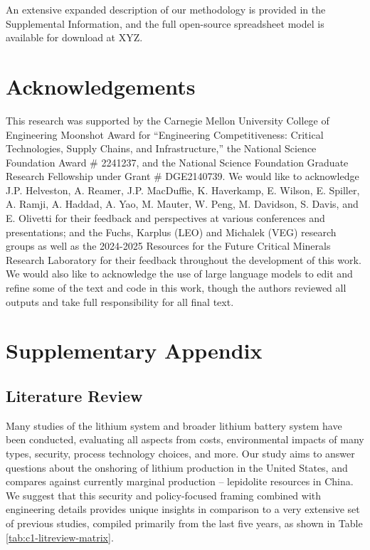 \documentclass{article}
\renewcommand\_{\textunderscore\allowbreak}
\begin{document}
An extensive expanded description of our methodology is provided in the Supplemental Information, and the full open-source spreadsheet model is available for download at XYZ.

\section{Acknowledgements}
This research was supported by the Carnegie Mellon University College of Engineering Moonshot Award for ``Engineering Competitiveness: Critical Technologies, Supply Chains, and Infrastructure,'' the National Science Foundation Award # 2241237, and the National Science Foundation Graduate Research Fellowship under Grant # DGE2140739. We would like to acknowledge J.P. Helveston, A. Reamer, J.P. MacDuffie, K. Haverkamp, E. Wilson, E. Spiller, A. Ramji, A. Haddad, A. Yao, M. Mauter, W. Peng, M. Davidson, S. Davis, and E. Olivetti for their feedback and perspectives at various conferences and presentations; and the Fuchs, Karplus (LEO) and Michalek (VEG) research groups as well as the 2024-2025 Resources for the Future Critical Minerals Research Laboratory for their feedback throughout the development of this work. We would also like to acknowledge the use of large language models to edit and refine some of the text and code in this work, though the authors reviewed all outputs and take full responsibility for all final text.

\clearpage




\clearpage

\section{Supplementary Appendix}\label{app:04}

\subsection{Literature Review}\label{app:04-litreview}

Many studies of the lithium system and broader lithium battery system have been conducted, evaluating all aspects from costs, environmental impacts of many types, security, process technology choices, and more. Our study aims to answer questions about the onshoring of lithium production in the United States, and compares against currently marginal production -- lepidolite resources in China. We suggest that this security and policy-focused framing combined with engineering details provides unique insights in comparison to a very extensive set of previous studies, compiled primarily from the last five years, as shown in Table \ref{tab:c1-litreview-matrix}. 
\end{document}
